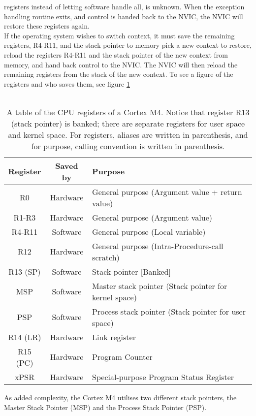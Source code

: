 registers instead of letting software handle all, is unknown. 
When the exception handling routine exits, and control is handed back to the NVIC,
the NVIC will restore these registers again.\\
If the operating system wishes to switch context, it must save the remaining registers, R4-R11, and the stack pointer to memory
pick a new context to restore, reload the registers R4-R11 and the stack pointer of the new context from memory,
and hand back control to the NVIC. The NVIC will then reload the remaining registers from the stack of the new context. To see a figure of the registers and who saves them, see figure \ref{tab:registers}\\\\
\begin{table}[H]
	\centering
	\begin{tabular}{|c|c|p{9.5cm}|}
		\hline
		Register	&	Saved by	&	Purpose\\
		\hline
		R0			&	Hardware	&	General purpose (Argument value + return value)\\
		\hline
		R1-R3		&	Hardware	&	General purpose (Argument value)\\
		\hline
		R4-R11		&	Software	&	General purpose (Local variable)\\
		\hline
		R12			&	Hardware	&	General purpose (Intra-Procedure-call scratch)\\
		\hline
		R13 (SP)	&	Software	&	Stack pointer [Banked]\\
		MSP			&	Software	&	Master stack pointer (Stack pointer for kernel space)\\
		PSP			&	Software	&	Process stack pointer (Stack pointer for user space)\\
		\hline
		R14 (LR)	&	Hardware	&	Link register\\
		\hline
		R15 (PC)	&	Hardware	&	Program Counter\\
		\hline
		xPSR		&	Hardware	& 	Special-purpose Program Status Register\\
		\hline
	\end{tabular}
	\caption{A table of the CPU registers of a Cortex M4. Notice that register R13 (stack pointer) is banked;
	there are separate registers for user space and kernel space.
	For registers, aliases are written in parenthesis, and for purpose, calling convention is written in parenthesis.}
	\label{tab:registers}
\end{table}
As added complexity, the Cortex M4 utilises two different stack pointers, the Master Stack Pointer (MSP) and the Process Stack Pointer (PSP).
